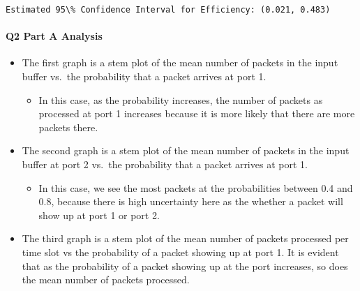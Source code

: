 \documentclass[11pt]{article}
\makeatletter
\providecommand{\tightlist}{%
      \setlength{\itemsep}{0pt}\setlength{\parskip}{0pt}}
\newcommand{\boxspacing}{\kern\kvtcb@left@rule\kern\kvtcb@boxsep}
\newcommand{\prompt}[4]{
        \ttfamily\llap{{\color{#2}[#3]:\hspace{3pt}#4}}\vspace{-\baselineskip}
    }
\makeatother
\begin{document}
    \begin{Verbatim}[commandchars=\\\{\}]
Estimated 95\% Confidence Interval for Efficiency: (0.021, 0.483)
    \end{Verbatim}

    \hypertarget{q2-part-a-analysis}{%
\paragraph{Q2 Part A Analysis}\label{q2-part-a-analysis}}

    \begin{itemize}
\tightlist
\item
  The first graph is a stem plot of the mean number of packets in the
  input buffer vs.~the probability that a packet arrives at port 1.

  \begin{itemize}
  \tightlist
  \item
    In this case, as the probability increases, the number of packets as
    processed at port 1 increases because it is more likely that there
    are more packets there.
  \end{itemize}
\item
  The second graph is a stem plot of the mean number of packets in the
  input buffer at port 2 vs.~the probability that a packet arrives at
  port 1.

  \begin{itemize}
  \tightlist
  \item
    In this case, we see the most packets at the probabilities between
    0.4 and 0.8, because there is high uncertainty here as the whether a
    packet will show up at port 1 or port 2.
  \end{itemize}
\item
  The third graph is a stem plot of the mean number of packets processed
  per time slot vs the probability of a packet showing up at port 1. It
  is evident that as the probability of a packet showing up at the port
  increases, so does the mean number of packets processed.
\end{itemize}

    \begin{tcolorbox}[breakable, size=fbox, boxrule=1pt, pad at break*=1mm,colback=cellbackground, colframe=cellborder]
\prompt{In}{incolor}{ }{\boxspacing}
\begin{Verbatim}[commandchars=\\\{\}]

\end{Verbatim}
\end{tcolorbox}


    
    
    
\end{document}
